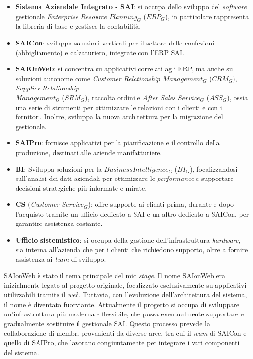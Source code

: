     \begin{itemize}
        \item \textbf{Sistema Aziendale Integrato - SAI}: si occupa dello sviluppo del \textit{software} gestionale \textit{Enterprise Resource $Planning_G$} ($ERP_G$), in particolare rappresenta la libreria di base e gestisce la contabilità.
        \item \textbf{SAICon}: sviluppa soluzioni verticali per il settore delle confezioni (abbigliamento) e calzaturiero, integrate con l'ERP SAI.
        \item \textbf{SAIOnWeb}: si concentra su applicativi correlati agli ERP, ma anche su soluzioni autonome come \textit{Customer Relationship $Management_G$} ($CRM_G$), \textit{Supplier Relationship \\
        $Management_G$} ($SRM_G$), raccolta ordini e \textit{After Sales $Service_G$} ($ASS_G$), ossia una serie di strumenti per ottimizzare le relazioni con i clienti e con i fornitori. Inoltre, sviluppa la nuova architettura per la migrazione del gestionale.
        \item \textbf{SAIPro}: fornisce applicativi per la pianificazione e il controllo della produzione, destinati alle aziende manifatturiere.
        \item \textbf{BI}: Sviluppa soluzioni per la \textit{$Business Intelligence_G$} ($BI_G$), focalizzandosi sull'analisi dei dati aziendali per ottimizzare le \textit{performance} e supportare decisioni strategiche più informate e mirate. 
        \item \textbf{CS} (\textit{Customer $Service_G$}): offre supporto ai clienti prima, durante e dopo l'acquisto tramite un ufficio dedicato a SAI e un altro dedicato a SAICon, per garantire assistenza costante.
        \item \textbf{Ufficio sistemistico}: si occupa della gestione dell'infrastruttura \textit{hardware}, sia interna all'azienda che per i clienti che richiedono supporto, oltre a fornire assistenza ai \textit{team} di sviluppo.
    \end{itemize}
    
    \noindent SAIonWeb è stato il tema principale del mio \textit{stage}. Il nome SAIonWeb era inizialmente legato al progetto originale, focalizzato esclusivamente su applicativi utilizzabili tramite il \textit{web}. Tuttavia, con l'evoluzione dell'architettura del sistema, il nome è diventato fuorviante. Attualmente il progetto si occupa di sviluppare un'infrastruttura più moderna e flessibile, che possa eventualmente supportare e gradualmente sostituire il gestionale SAI. 
    Questo processo prevede la collaborazione di membri provenienti da diverse aree, tra cui il \textit{team} di SAICon e quello di SAIPro, che lavorano congiuntamente per integrare i vari componenti del sistema.
    \vspace{0.2 em}

